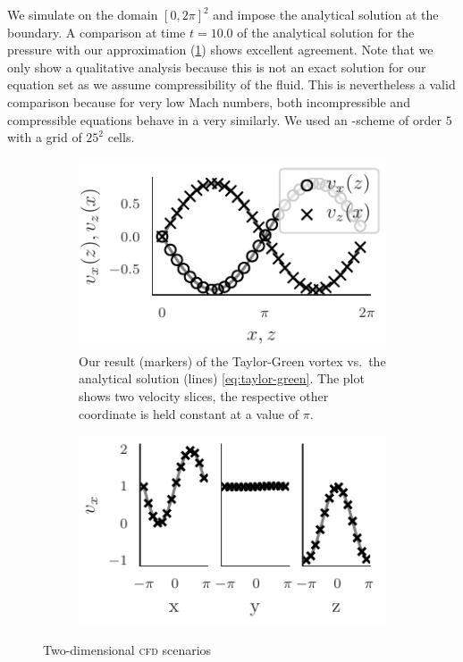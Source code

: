 \documentclass[runningheads]{llncs}
\begin{document}
We simulate on the domain $[0,2\pi]^2$ and impose the analytical solution at the boundary.
A comparison at time $t = 10.0$ of the analytical solution for the pressure with our approximation (\cref{fig:taylor-green}) shows excellent agreement.
Note that we only show a qualitative analysis because this is not an exact solution for our equation set as we assume compressibility of the fluid.
This is nevertheless a valid comparison because for very low Mach numbers, both incompressible and compressible equations behave in a very similarly.
We used an \aderdg{}-scheme of order $5$ with a grid of $25^2$ cells.
%
\begin{figure}[tb]
  \centering
  \begin{subfigure}[t]{0.473\textwidth}
    \centering
    \includegraphics{paper_taylor_green_vel}
    \caption{\label{fig:taylor-green}Our result (markers) of the Taylor-Green vortex vs.\ the analytical solution (lines) \cref{eq:taylor-green}.
    The plot shows two velocity slices, the respective other coordinate is held constant at a value of $\pi$.}
  \end{subfigure}\qquad%
\begin{subfigure}[t]{.473\textwidth}
  \centering
    \includegraphics{paper_abc_flow_velocity}
\end{subfigure}
  \caption{\label{fig:cdf-results}Two-dimensional \textsc{cfd} scenarios}
\end{figure}
\end{document}
